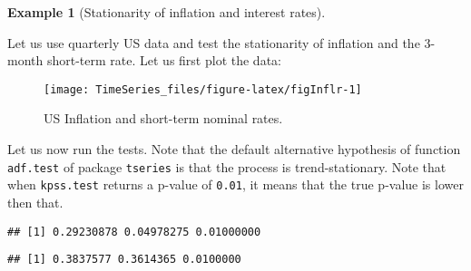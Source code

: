 \documentclass[
  12pt,
]{book}
\newenvironment{Shaded}{\begin{snugshade}}{\end{snugshade}}
\newcommand{\AttributeTok}[1]{\textcolor[rgb]{0.77,0.63,0.00}{#1}}
\newcommand{\DecValTok}[1]{\textcolor[rgb]{0.00,0.00,0.81}{#1}}
\newcommand{\FunctionTok}[1]{\textcolor[rgb]{0.00,0.00,0.00}{#1}}
\newcommand{\NormalTok}[1]{#1}
\newcommand{\OtherTok}[1]{\textcolor[rgb]{0.56,0.35,0.01}{#1}}
\newcommand{\SpecialCharTok}[1]{\textcolor[rgb]{0.00,0.00,0.00}{#1}}
\theoremstyle{definition}
\theoremstyle{definition}
\newtheorem{example}{Example}[chapter]
\theoremstyle{definition}
\theoremstyle{definition}
\theoremstyle{remark}
\begin{document}
\begin{example}[Stationarity of inflation and interest rates]
\protect\hypertarget{exm:NonStatExample}{}\label{exm:NonStatExample}

Let us use quarterly US data and test the stationarity of inflation and the 3-month short-term rate. Let us first plot the data:

\begin{figure}
\texttt{[image: TimeSeries\_files/figure-latex/figInflr-1]} \caption{US Inflation and short-term nominal rates.}\label{fig:figInflr}
\end{figure}

Let us now run the tests. Note that the default alternative hypothesis of function \texttt{adf.test} of package \texttt{tseries} is that the process is trend-stationary. Note that when \texttt{kpss.test} returns a p-value of \texttt{0.01}, it means that the true p-value is lower then that.

\begin{Shaded}
\end{Shaded}

\begin{verbatim}
## [1] 0.29230878 0.04978275 0.01000000
\end{verbatim}

\begin{Shaded}
\end{Shaded}

\begin{verbatim}
## [1] 0.3837577 0.3614365 0.0100000
\end{verbatim}

\end{example}
\end{document}
